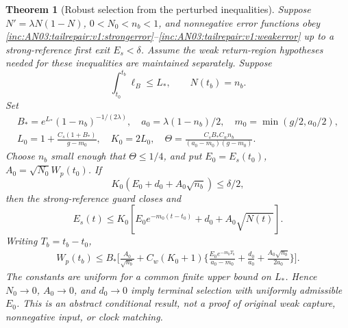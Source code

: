 \documentclass[11pt]{article}
\newtheorem{theorem}{Theorem}[section]
\theoremstyle{remark}\newtheorem{remark}[theorem]{Remark}
\begin{document}
\begin{theorem}[Robust selection from the perturbed inequalities]
\label{inc:AN03:tailrepair:v1:selection}
Suppose $N'=\lambda N(1-N)$, $0<N_0<n_b<1$, and nonnegative error functions obey \eqref{inc:AN03:tailrepair:v1:strongerror}--\eqref{inc:AN03:tailrepair:v1:weakerror} up to a strong-reference first exit $E_s<\delta$. Assume the weak return-region hypotheses needed for these inequalities are maintained separately. Suppose
\[
 \int_{t_0}^{t_b}\ell_B\le L_*,\qquad N(t_b)=n_b.
\]
Set
\begin{gather*}
 B_*=e^{L_*}(1-n_b)^{-1/(2\lambda)},\quad
 a_0=\lambda(1-n_b)/2,\quad m_0=\min(g/2,a_0/2),\\
 L_0=1+\frac{C_s(1+B_*)}{g-m_0},\quad K_0=2L_0,\quad
 \Theta=\frac{C_sB_*C_wn_b}{(a_0-m_0)(g-m_0)}.
\end{gather*}
Choose $n_b$ small enough that $\Theta\le1/4$, and put $E_0=E_s(t_0)$, $A_0=\sqrt{N_0}W_p(t_0)$. If
\[
 K_0(E_0+d_0+A_0\sqrt{n_b})\le\delta/2,
\]
then the strong-reference guard closes and
\begin{equation}\label{inc:AN03:tailrepair:v1:Econclusion}
 E_s(t)\le K_0[E_0e^{-m_0(t-t_0)}+d_0+A_0\sqrt{N(t)}].
\end{equation}
Writing $T_b=t_b-t_0$,
\begin{align}\label{inc:AN03:tailrepair:v1:Wconclusion}
 W_p(t_b)\le B_*\Bigg[\frac{A_0}{\sqrt{n_b}}
 +C_w(K_0+1)\bigg\{
 \frac{E_0e^{-m_0T_b}}{a_0-m_0}+\frac{d_0}{a_0}
                   +\frac{A_0\sqrt{n_b}}{2a_0}\bigg\}\Bigg].
\end{align}
The constants are uniform for a common finite upper bound on $L_*$. Hence $N_0\to0$, $A_0\to0$, and $d_0\to0$ imply terminal selection with uniformly admissible $E_0$. This is an abstract conditional result, not a proof of original weak capture, nonnegative input, or clock matching.
\end{theorem}
\end{document}
